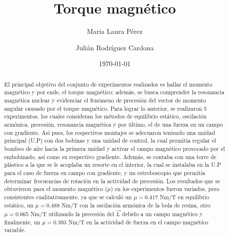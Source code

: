\documentclass[%
 reprint,
 amsmath,amssymb,
 aps,
]{revtex4-1}
\begin{document}

\title{Torque magnético}%

\author{Maria Laura Pérez}
\author{Julián Rodríguez Cardona}%
%


\date{\today}%

\begin{abstract}
El principal objetivo del conjunto de experimentos realizados es hallar el momento magnético y por ende, el torque magnético; además, se busca comprender la resonancia magnética nuclear y evidenciar el fenómeno de precesión del vector de momento angular causado por el torque magnético. Para lograr lo anterior, se realizaron 5 experimentos, los cuales consideran los métodos de equilibrio estático, oscilación armónica, precesión, resonancia magnética y por último, el de una fuerza en un campo con gradiente. Así pues, los respectivos montajes se adecuaron teniendo una unidad principal (U.P) con dos bobinas y una unidad de control, la cual permitía regular el bombeo de aire hacia la primera unidad y activar el campo magnético provocado por el embobinado, así como su respectivo gradiente. Además, se contaba con una torre de plástico a la que se le acoplaba un resorte en el interior, la cual se instalaba en la U.P para el caso de fuerza en campo con gradiente, y un estroboscopio que permitía determinar frecuencias de rotación en la actividad de precesión. Los resultados que se obtuvieron para el momento magnético ($\mu$) en los experimentos fueron variados, pero consistentes cualitativamente, ya que se calculó un $\mu = 0.417$ Nm/T en equilibrio estático, un $\mu = 0.488$ Nm/T con la oscilación armónica de la bola de resina, otro $\mu = 0.665$ Nm/T utilizando la precesión del $\vec{L}$ debido a un campo magnético y finalmente, un $\mu = 0.393$ Nm/T en la actividad de fuerza en el campo magnético variable.
\end{abstract}

\maketitle
\end{document}
